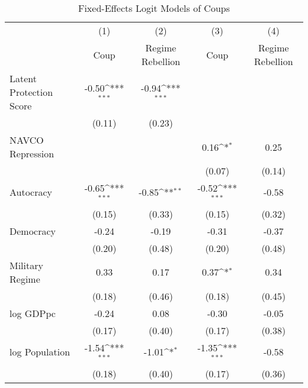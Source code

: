 \begin{table}[htbp]\centering
\def\sym#1{\ifmmode^{#1}\else\(^{#1}\)\fi}
\caption{\label{tab1} Fixed-Effects Logit Models of Coups}
\begin{tabular}{l*{4}{c}}
\hline\hline
                    &\multicolumn{1}{c}{(1)}         &\multicolumn{1}{c}{(2)}         &\multicolumn{1}{c}{(3)}         &\multicolumn{1}{c}{(4)}         \\
                    &        Coup         &Regime Rebellion         &        Coup         &Regime Rebellion         \\
\hline
Latent Protection Score&       -0.50\sym{***}&       -0.94\sym{***}&                     &                     \\
                    &      (0.11)         &      (0.23)         &                     &                     \\
NAVCO Repression    &                     &                     &        0.16\sym{*}  &        0.25         \\
                    &                     &                     &      (0.07)         &      (0.14)         \\
Autocracy           &       -0.65\sym{***}&       -0.85\sym{**} &       -0.52\sym{***}&       -0.58         \\
                    &      (0.15)         &      (0.33)         &      (0.15)         &      (0.32)         \\
Democracy           &       -0.24         &       -0.19         &       -0.31         &       -0.37         \\
                    &      (0.20)         &      (0.48)         &      (0.20)         &      (0.48)         \\
Military Regime     &        0.33         &        0.17         &        0.37\sym{*}  &        0.34         \\
                    &      (0.18)         &      (0.46)         &      (0.18)         &      (0.45)         \\
log GDPpc           &       -0.24         &        0.08         &       -0.30         &       -0.05         \\
                    &      (0.17)         &      (0.40)         &      (0.17)         &      (0.38)         \\
log Population      &       -1.54\sym{***}&       -1.01\sym{*}  &       -1.35\sym{***}&       -0.58         \\
                    &      (0.18)         &      (0.40)         &      (0.17)         &      (0.36)         \\

\end{tabular}
\end{table}
